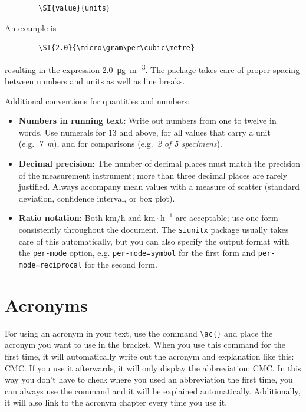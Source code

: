 {    \begin{Verbatim}
    	\SI{value}{units}
    \end{Verbatim}
    
    An example is 
    
    \begin{Verbatim}
    	\SI{2.0}{\micro\gram\per\cubic\metre}
    \end{Verbatim}

    resulting in the expression \SI{2.0}{\micro\gram\per\cubic\metre}. The package takes care of proper spacing between numbers and units as well as line breaks.

    Additional conventions for quantities and numbers:
    \begin{itemize}
        \item \textbf{Numbers in running text:} Write out numbers from one to twelve in words. Use numerals for 13 and above, for all values that carry a unit (e.g.\ \emph{7~\textmu m}), and for comparisons (e.g.\ \emph{2 of 5 specimens}).
        \item \textbf{Decimal precision:} The number of decimal places must match the precision of the measurement instrument; more than three decimal places are rarely justified. Always accompany mean values with a measure of scatter (standard deviation, confidence interval, or box plot).
        \item \textbf{Ratio notation:} Both $\textrm{km/h}$ and $\textrm{km}\cdot\textrm{h}^{-1}$ are acceptable; use one form consistently throughout the document. The \texttt{siunitx} package usually takes care of this automatically, but you can also specify the output format with the \verb|per-mode| option, e.g. \verb|per-mode=symbol| for the first form and \verb|per-mode=reciprocal| for the second form.
    \end{itemize}

    \section*{Acronyms}
    For using an acronym in your text, use the command \verb|\ac{}| and place the acronym you want to use in the bracket. When you use this command for the first time, it will automatically write out the acronym and explanation like this: \ac{CMC}. If you use it afterwards, it will only display the abbreviation: \ac{CMC}.
    In this way you don't have to check where you used an abbreviation the first time, you can always use the command and it will be explained automatically. Additionally, it will also link to the acronym chapter every time you use it.
    
}
